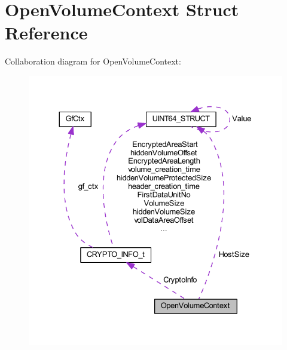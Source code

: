 \hypertarget{struct_open_volume_context}{}\section{Open\+Volume\+Context Struct Reference}
\label{struct_open_volume_context}


Collaboration diagram for Open\+Volume\+Context\+:
\nopagebreak
\begin{figure}[H]
\begin{center}
\leavevmode
\includegraphics[width=330pt]{struct_open_volume_context__coll__graph}
\end{center}
\end{figure}
